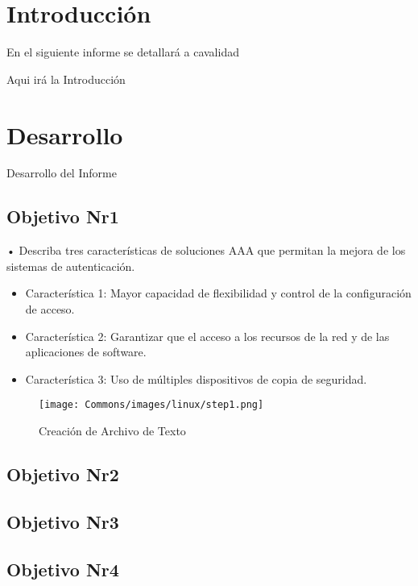 \documentclass[12pt,letterpaper]{article}
\begin{document}


\section{Introducción}

En el siguiente informe se detallará a cavalidad

Aqui irá la Introducción

\newpage

\section{Desarrollo}




Desarrollo del Informe

\subsection{Objetivo Nr1}

•	Describa tres características de soluciones AAA que permitan la mejora de los sistemas de autenticación.

\begin{itemize}
    \item Característica 1: Mayor capacidad de flexibilidad y control de la configuración de acceso.
    \item Característica 2: Garantizar que el acceso a los recursos de la red y de las aplicaciones de software.
    \item Característica 3: Uso de múltiples dispositivos de copia de seguridad.
\end{itemize}

\begin{figure}[H]
    \centering
    \captionsetup{width=.4\linewidth}
    \texttt{[image: Commons/images/linux/step1.png]}
    \caption{Creación de Archivo de Texto}
    \label{fig:ipc}
\end{figure}

\subsection{Objetivo Nr2}
\subsection{Objetivo Nr3}
\subsection{Objetivo Nr4}
\end{document}
